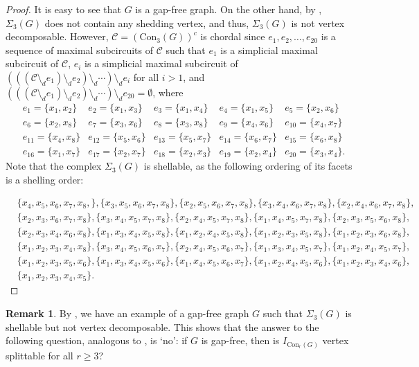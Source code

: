 \documentclass[12pt,reqno]{amsart}
\theoremstyle{definition}
\newtheorem{remark}[proposition]{Remark}
\newcommand{\Con}{{\mathrm{Con}}}
\begin{document}
\begin{proof}
    It is easy to see that $G$ is a gap-free graph. On the other hand, by , $\Sigma_{3}(G)$ does not contain any shedding vertex, and thus, $\Sigma_{3}(G)$ is not vertex decomposable. However, $\mathcal C=(\Con_3(G))^c$ is chordal since $e_1,e_2,\ldots,e_{20}$ is a sequence of maximal subcircuits of $\mathcal C$ such that $e_1$ is a simplicial maximal subcircuit of $\mathcal C$, $e_i$ is a simplicial maximal subcircuit of $(((\mathcal C\setminus_d e_1)\setminus_d e_2)\setminus_d\cdots)\setminus_d e_i$ for all $i>1$, and $(((\mathcal C\setminus_d e_1)\setminus_d e_2)\setminus_d\cdots)\setminus_d e_{20}=\emptyset$, where
	\[
	\begin{array}{rrrrrrrrrr}
		& e_1 = \{x_1,x_2\} & e_2= \{x_1,x_3\} & e_3= \{x_1,x_4\} & e_4= \{x_1,x_5\} & e_5= \{x_2,x_6\} \\ & e_6= \{x_2,x_8\}		
		& e_7 = \{x_3,x_6\} & e_8= \{x_3,x_8\} & e_9= \{x_4,x_6\}& e_{10}= \{x_4,x_7\} \\
		& e_{11}= \{x_4,x_8\} & e_{12}= \{x_5,x_6\}
		 & e_{13} = \{x_5,x_7\} & e_{14}= \{x_6,x_7\} & e_{15}= \{x_6,x_8\}\\ & e_{16}= \{x_1,x_7\} & e_{17}= \{x_2,x_7\} &e_{18}= \{x_2,x_3\}
		  & e_{19} = \{x_2,x_4\} & e_{20}= \{x_3,x_4\}.
	\end{array}
	\]
	Note that the complex $\Sigma_{3}(G)$ is shellable, as the following ordering of its facets is a shelling order:
	
	\[
	\begin{aligned}
		&\{x_4,x_5,x_6,x_7,x_8,\},\{x_3,x_5,x_6,x_7,x_8\},\{x_2,x_5,x_6,x_7,x_8\},\{x_3,x_4,x_6,x_7,x_8\},\{x_2,x_4,x_6,x_7,x_8\},\\
		&\{x_2,x_3,x_6,x_7,x_8\},\{x_3,x_4,x_5,x_7,x_8\},\{x_2,x_4,x_5,x_7,x_8\},\{x_1,x_4,x_5,x_7,x_8\},\{x_2,x_3,x_5,x_6,x_8\},\\
		&\{x_2,x_3,x_4,x_6,x_8\},\{x_1,x_3,x_4,x_5,x_8\},\{x_1,x_2,x_4,x_5,x_8\},\{x_1,x_2,x_3,x_5,x_8\},\{x_1,x_2,x_3,x_6,x_8\},\\
		&\{x_1,x_2,x_3,x_4,x_8\},\{x_3,x_4,x_5,x_6,x_7\},\{x_2,x_4,x_5,x_6,x_7\},\{x_1,x_3,x_4,x_5,x_7\},\{x_1,x_2,x_4,x_5,x_7\},\\
		&
		\{x_1,x_2,x_3,x_5,x_6\},\{x_1,x_3,x_4,x_5,x_6\},\{x_1,x_4,x_5,x_6,x_7\},\{x_1,x_2,x_4,x_5,x_6\},\{x_1,x_2,x_3,x_4,x_6\},\\
		&\{x_1,x_2,x_3,x_4,x_5\}.
	\end{aligned}
	\]
    \end{proof}
    \begin{remark}
       By , we have an example of a gap-free graph $G$ such that $\Sigma_{3}(G)$ is shellable but not vertex decomposable. This shows that the answer to the following question, analogous to \cite[Question 7.5]{LQCG}, is `no': if $G$ is gap-free, then is $I_{\mathrm{Con}_r(G)}$ vertex splittable for all $r\ge 3$? 
    \end{remark}
	
\end{document}
